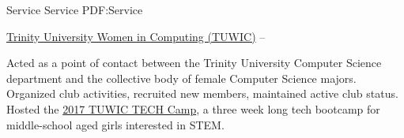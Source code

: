 \Section
{Service}
{Service}
{PDF:Service}

\Entry
\TrinityTitle

\SubEntry
\Gap
\href{https://new.trinity.edu/news/get-program}
{Trinity University Women in Computing (TUWIC)}
\dotfill
{} -- 
\begin{Detail}
    \SubBulletItem
    Acted as a point of contact between the Trinity University Computer Science department and the collective body of female Computer Science majors.
    \SubBulletItem
    Organized club activities, recruited new members, maintained active club status.
    \SubBulletItem
    Hosted the \href{http://www.cs.trinity.edu/~tuwic/TECHcamp/}{2017 TUWIC TECH Camp}, a three week long tech bootcamp for middle-school aged girls interested in STEM.
\end{Detail}
